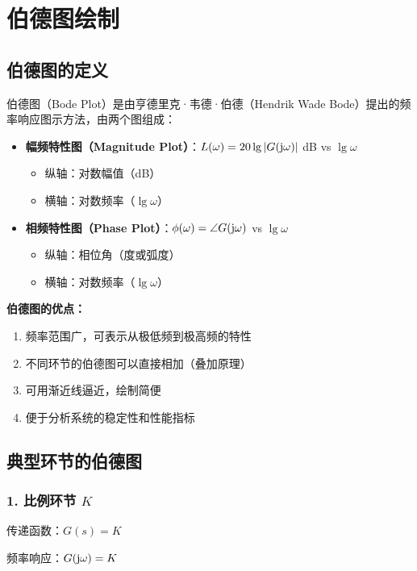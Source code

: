 \section{伯德图绘制}

\subsection{伯德图的定义}
伯德图（Bode Plot）是由亨德里克·韦德·伯德（Hendrik Wade Bode）提出的频率响应图示方法，由两个图组成：

\begin{itemize}
    \item \textbf{幅频特性图（Magnitude Plot）}：$L(\omega) = 20\lg|G(\mathrm{j}\omega)|$ dB vs $\lg\omega$
    \begin{itemize}
        \item 纵轴：对数幅值（dB）
        \item 横轴：对数频率（$\lg\omega$）
    \end{itemize}
    \item \textbf{相频特性图（Phase Plot）}：$\phi(\omega) = \angle G(\mathrm{j}\omega)$ vs $\lg\omega$
    \begin{itemize}
        \item 纵轴：相位角（度或弧度）
        \item 横轴：对数频率（$\lg\omega$）
    \end{itemize}
\end{itemize}

\textbf{伯德图的优点：}
\begin{enumerate}
    \item 频率范围广，可表示从极低频到极高频的特性
    \item 不同环节的伯德图可以直接相加（叠加原理）
    \item 可用渐近线逼近，绘制简便
    \item 便于分析系统的稳定性和性能指标
\end{enumerate}

\subsection{典型环节的伯德图}

\subsubsection{1. 比例环节 \texorpdfstring{$K$}{K}}
传递函数：$G(s) = K$

频率响应：$G(\mathrm{j}\omega) = K$

